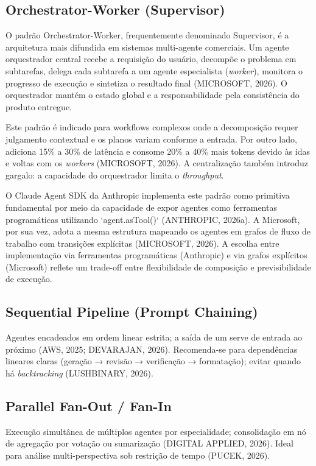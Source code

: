 \documentclass[12pt,a4paper]{article}
\begin{document}
\subsection{Orchestrator-Worker (Supervisor)}

O padrão Orchestrator-Worker, frequentemente denominado Supervisor, é a arquitetura mais difundida em sistemas multi-agente comerciais. Um agente orquestrador central recebe a requisição do usuário, decompõe o problema em subtarefas, delega cada subtarefa a um agente especialista (\textit{worker}), monitora o progresso de execução e sintetiza o resultado final (MICROSOFT, 2026). O orquestrador mantém o estado global e a responsabilidade pela consistência do produto entregue.

Este padrão é indicado para workflows complexos onde a decomposição requer julgamento contextual e os planos variam conforme a entrada. Por outro lado, adiciona 15\% a 30\% de latência e consome 20\% a 40\% mais tokens devido às idas e voltas com os \textit{workers} (MICROSOFT, 2026). A centralização também introduz gargalo: a capacidade do orquestrador limita o \textit{throughput}.

O Claude Agent SDK da Anthropic implementa este padrão como primitiva fundamental por meio da capacidade de expor agentes como ferramentas programáticas utilizando `agent.asTool()` (ANTHROPIC, 2026a). A Microsoft, por sua vez, adota a mesma estrutura mapeando os agentes em grafos de fluxo de trabalho com transições explícitas (MICROSOFT, 2026). A escolha entre implementação via ferramentas programáticas (Anthropic) e via grafos explícitos (Microsoft) reflete um trade-off entre flexibilidade de composição e previsibilidade de execução.

\subsection{Sequential Pipeline (Prompt Chaining)}

Agentes encadeados em ordem linear estrita; a saída de um serve de entrada ao próximo (AWS, 2025; DEVARAJAN, 2026). Recomenda-se para dependências lineares claras (geração → revisão → verificação → formatação); evitar quando há \textit{backtracking} (LUSHBINARY, 2026).

\subsection{Parallel Fan-Out / Fan-In}

Execução simultânea de múltiplos agentes por especialidade; consolidação em nó de agregação por votação ou sumarização (DIGITAL APPLIED, 2026). Ideal para análise multi-perspectiva sob restrição de tempo (PUCEK, 2026).
\end{document}
